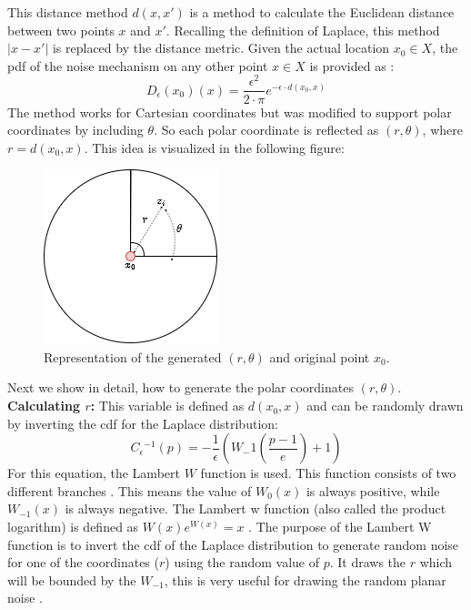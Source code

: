 This distance method $d(x, x')$ is a method to calculate the Euclidean distance between two points $x$ and $x'$.
Recalling the definition of Laplace, this method $|x-x'|$ is replaced by the distance metric.
Given the actual location $x_0 \in X$, the \gls{pdf} of the noise mechanism on any other point $x \in X$ is provided as \citep{DBLP:journals/corr/abs-1212-1984}: 
\begin{equation}
  D_\epsilon(x_0)(x) = \frac{\epsilon^2}{2 \cdot \pi}e^{-\epsilon \cdot d(x_0, x)}
  \label{eq:polar-laplace-pdf}
\end{equation}
The method works for Cartesian coordinates but was modified to support polar coordinates by including $\theta$.
So each polar coordinate is reflected as $(r, \theta)$, where $r = d(x_0, x)$.
This idea is visualized in the following figure:
\begin{figure}[H]
  \includegraphics[scale=0.6]{TheorethicalFramework/ND-Laplace/Images/polar-laplace.png}
  \centering
  \caption{Representation of the generated $(r,\theta)$ and original point $x_0$.}
  \label{figure:parea}
\end{figure}
Next we show in detail, how to generate the polar coordinates $(r, \theta)$. \newline
\textbf{Calculating $r$:}
This variable is defined as $d(x_0, x)$ and can be randomly drawn by inverting the \gls{cdf} for the Laplace distribution:
\begin{equation}
  C{_\epsilon}{^{-1}}(p) = - \frac{1}{\epsilon}(W_-1 (\frac{p - 1}{e}) + 1)
  \label{eq:lambert_w_1}
\end{equation}
For this equation, the Lambert $W$ function is used. This function consists of two different branches \citep{corless_lambertw_1996}. This means the value of $W_0(x)$ is always positive, while $W_{-1}(x)$ is always negative. The Lambert w function (also called the product logarithm) is defined as $W(x)e^{W(x)} = x$ \citep{lehtonen_lambert_2016}.
The purpose of the Lambert W function is to invert the \gls{cdf} of the Laplace distribution to generate random noise for one of the coordinates ($r$) using the random value of $p$. It draws the $r$ which will be bounded by the $W_{-1}$, this is very useful for drawing the random planar noise \citep{corless_lambertw_1996}.

